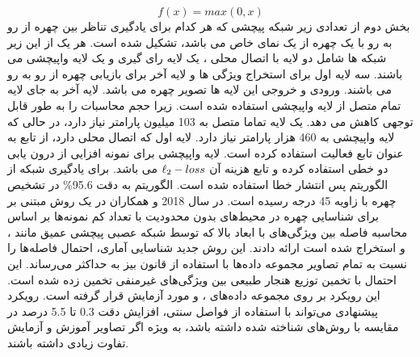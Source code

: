 \begin{equation}\label{eq2-10}
f(x)=max(0,x)
\end{equation}
\noindent
بخش دوم از تعدادی زیر شبکه پیچشی که هر کدام برای یادگیری تناظر بین چهره از رو به رو با یک چهره از یک نمای خاص می باشد، تشکیل شده است. هر یک از این زیر شبکه ها شامل دو لایه با اتصال محلی ، یک لایه رای گیری و یک لایه واپیچشی می باشند. سه لایه اول برای استخراج ویژگی ها و لایه آخر برای بازیابی چهره از رو به رو می باشند. ورودی و خروجی این لایه ها تصویر چهره می باشد. لایه آخر به جای لایه تمام متصل از لایه واپیچشی استفاده شده است. زیرا حجم محاسبات را به طور قابل توجهی کاهش می دهد. یک لایه تماما متصل به 103 میلیون پارامتر نیاز دارد، در حالی که لایه واپیچشی به 460 هزار پارامتر نیاز دارد. لایه اول که اتصال محلی دارد، از تابع  به عنوان تابع فعالیت استفاده کرده است. لایه واپیچشی برای نمونه افزایی از درون یابی دو خطی استفاده کرده و تابع هزینه آن
$\ell\textsubscript{2}-loss$
می باشد. برای یادگیری شبکه از الگوریتم پس انتشار خطا  استفاده شده است. الگوریتم  به دقت 95.6\% در تشخیص چهره با زاویه 45 درجه رسیده است.
\noindent
در سال 2018  و همکاران در \cite{SAVCHENKO2018170} یک روش مبتنی بر   برای شناسایی چهره در محیط‌های بدون محدودیت با تعداد کم نمونه‌ها بر اساس محاسبه فاصله بین ویژگی‌های با ابعاد بالا که توسط شبکه عصبی پیچشی عمیق مانند
،
و
استخراج شده است ارائه دادند. این روش جدید شناسایی آماری، احتمال فاصله‌ها را نسبت به تمام تصاویر مجموعه داده‌ها با استفاده از قانون بیز  به حداکثر می‌رساند. این احتمال با تخمین توزیع هنجار طبیعی  بین ویژگی‌های غیرمنفی تخمین زده شده است. این رویکرد بر روی مجموعه داده‌های
،
و
 مورد آزمایش قرار گرفته است. رویکرد پیشنهادی می‌تواند با استفاده از فواصل سنتی، افزایش دقت 0.3 تا 5.5 درصد در مقایسه با روش‌های شناخته شده داشته باشد، به ویژه اگر تصاویر آموزش و آزمایش تفاوت زیادی داشته باشند.
 
